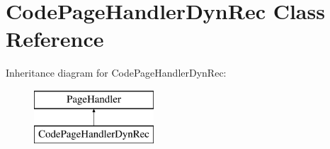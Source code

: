 \hypertarget{classCodePageHandlerDynRec}{\section{Code\-Page\-Handler\-Dyn\-Rec Class Reference}
\label{classCodePageHandlerDynRec}
}
Inheritance diagram for Code\-Page\-Handler\-Dyn\-Rec\-:\begin{figure}[H]
\begin{center}
\leavevmode
\includegraphics[height=2.000000cm]{classCodePageHandlerDynRec}
\end{center}
\end{figure}
